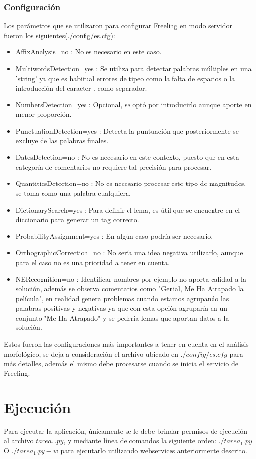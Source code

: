 \documentclass[12pt]{article}
\begin{document}
\subsubsection{Configuración}\label{configFree}
Los parámetros que se utilizaron para configurar Freeling en modo servidor fueron los siguientes(./config/es.cfg):
\begin{itemize}
\item AffixAnalysis=no : No es necesario en este caso.
\item MultiwordsDetection=yes : Se utiliza para detectar palabras múltiples en una 'string' ya que es habitual errores de tipeo como la falta de espacios o la introducción del caracter $.$ como separador.
\item NumbersDetection=yes : Opcional, se optó por introducirlo aunque aporte en menor proporción.
\item PunctuationDetection=yes : Detecta la puntuación que posteriormente se excluye de las palabras finales.
\item DatesDetection=no : No es necesario en este contexto, puesto que en esta categoría de comentarios no requiere tal precisión para procesar.
\item QuantitiesDetection=no : No es necesario procesar este tipo de magnitudes, se toma como una palabra cualquiera. 
\item DictionarySearch=yes : Para definir el lema, es útil que se encuentre en el diccionario para generar un tag correcto.
\item ProbabilityAssignment=yes : En algún caso podría ser necesario.
\item OrthographicCorrection=no : No sería una idea negativa utilizarlo, aunque para el caso no es una prioridad a tener en cuenta.
\item NERecognition=no : Identificar nombres por ejemplo no aporta calidad a la solución, además se observa comentarios como "Genial, Me Ha Atrapado la película", en realidad genera problemas cuando estamos agrupando las palabras positivas y negativas ya que con esta opción agruparía en un conjunto "Me Ha Atrapado" y se pedería lemas que aportan datos a la solución.
\end{itemize}
Estos fueron las configuraciones más importantes a tener en cuenta en el análisis morfológico, se deja a consideración el archivo ubicado en $./config/es.cfg$ para más detalles, además el mismo debe procesarse cuando se inicia el servicio de Freeling.


\section{Ejecución}
Para ejecutar la aplicación, únicamente se le debe brindar permisos de ejecución al archivo $tarea_1.py$, y mediante línea de comandos la siguiente orden:
$./tarea_1.py$
O $./tarea_1.py -w$ para ejecutarlo utilizando webservices anteriormente descrito.
\end{document}
